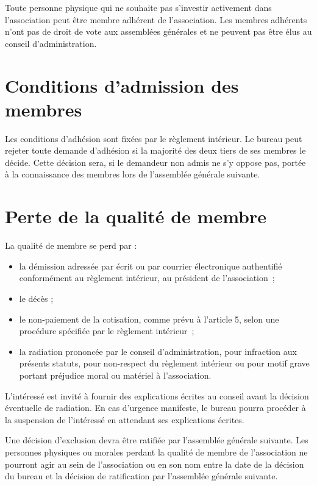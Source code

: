 \documentclass[a4wide,12pt]{scrartcl}
\begin{document}
Toute personne physique qui ne souhaite pas s’investir activement dans
l’association peut être membre adhérent de l’association. Les membres
adhérents n’ont pas de droit de vote aux assemblées générales et ne
peuvent pas être élus au conseil d’administration.

\section{Conditions d'admission des membres}

Les conditions d'adhésion sont fixées par le règlement intérieur. Le
bureau peut rejeter toute demande d'adhésion si la majorité des deux
tiers de ses membres le décide. Cette décision sera, si le demandeur
non admis ne s'y oppose pas, portée à la connaissance des membres lors
de l'assemblée générale suivante.

\section{Perte de la qualité de membre}

La qualité de membre se perd par :
\begin{itemize}
\item la démission adressée par écrit ou par courrier électronique
  authentifié conformément au règlement intérieur, au président de
  l'association~;
\item le décès ;
\item le non-paiement de la cotisation, comme prévu à l'article 5,
  selon une procédure spécifiée par le règlement intérieur~;
\item la radiation prononcée par le conseil d'administration, pour
  infraction aux présents statuts, pour non-respect du règlement
  intérieur ou pour motif grave portant préjudice moral ou matériel à
  l'association.
\end{itemize}

L'intéressé est invité à fournir des explications écrites au conseil
avant la décision éventuelle de radiation. En cas d'urgence manifeste,
le bureau pourra procéder à la suspension de l'intéressé en attendant
ses explications écrites.

Une décision d'exclusion devra être ratifiée par l'assemblée générale suivante. 
Les personnes physiques ou morales perdant la qualité de membre de
l'association ne pourront agir au sein de l'association ou en son nom
entre la date de la décision du bureau et la décision de ratification
par l'assemblée générale suivante.
\end{document}
